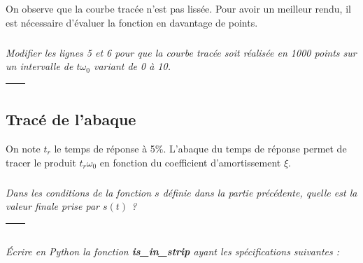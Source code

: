 \documentclass[10pt]{article}
\newif\ifprof
\begin{document}
\vspace{1cm}

\fi


On observe que la courbe tracée n'est pas lissée. Pour avoir un meilleur rendu, il est nécessaire d'évaluer la fonction en davantage de points. 
\fi

\subparagraph{}
\textit{Modifier les lignes 5 et 6 pour que la courbe tracée soit réalisée en 1000 points sur un intervalle de $t \omega_0$ variant de 0 à 10. }

\ifprof
\begin{corrige}
\begin{py}
\begin{python}
def trace_s(z):
    x = []
    y = []
    n = 1000
    for i in range(n+1):
        t = 10*i/n
        x.append(t)
        y.append(f_s(t,z))
    plot(x,y)
\end{python}
\end{py}
\end{corrige}
\else

\begin{tabular}{|p{}|}
\hline
$$\quad$$
\vspace{2cm}
$$\quad$$ \\
\hline
\end{tabular}
\fi

\subsection*{Tracé de l'abaque}

On note $t_r$  le temps de réponse à 5\%. L'abaque du temps de réponse permet de tracer le produit $t_r\omega_0$ en fonction du coefficient d'amortissement $\xi$.

\subparagraph{}
\textit{Dans les conditions de la fonction $s$ définie dans la partie précédente, quelle est la valeur finale prise par $s(t)$ ?} 
\ifprof
\begin{corrige}
La valeur finale est 1. 
\end{corrige}
\else


\begin{tabular}{|p{}|}
\hline
$$\quad$$ \\
\hline
\end{tabular}
\fi

\newpage


\subparagraph{}
\textit{Écrire en Python la fonction \textsf{\textbf{is\_in\_strip}} ayant les spécifications suivantes : } 
\ifprof
\else
\end{document}
